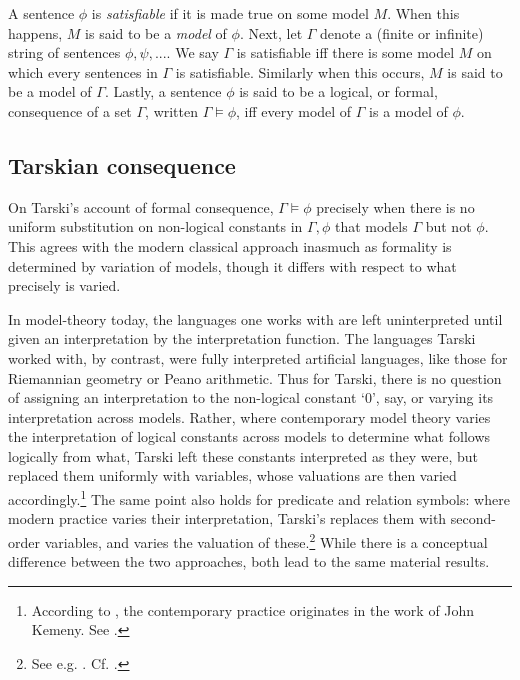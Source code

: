 \documentclass[]{article}
\begin{document}
A sentence $\phi$ is \textit{satisfiable} if it is made true on some model $M$. When this happens, $M$ is said to be a \textit{model} of $\phi$. Next, let $\Gamma$ denote a (finite or infinite) string of sentences $\phi, \psi, ...$. We say $\Gamma$ is satisfiable iff there is some model $M$ on which every sentences in $\Gamma$ is satisfiable. Similarly when this occurs, $M$ is said to be a model of $\Gamma$. Lastly, a sentence $\phi$ is said to be a logical, or formal, consequence of a set $\Gamma$, written $\Gamma \models \phi$, iff every model of $\Gamma$ is a model of $\phi$.
\subsection{Tarskian consequence}
On Tarski's account of formal consequence, $\Gamma \models \phi$ precisely when there is no uniform substitution on  non-logical constants in $\Gamma, \phi$ that models $\Gamma$ but not $\phi$. This agrees with the modern classical approach inasmuch as formality is determined by variation of models, though it differs with respect to what precisely is varied.

In model-theory today, the languages one works with are left uninterpreted until given an interpretation by the interpretation function. The languages Tarski worked with, by contrast, were fully interpreted artificial languages, like those for Riemannian geometry or Peano arithmetic. Thus for Tarski, there is no question of assigning an interpretation to the non-logical constant `0', say, or varying its interpretation across models. Rather, where contemporary model theory varies the interpretation of logical constants across models to determine what follows logically from what, Tarski left these constants interpreted as they were, but replaced them uniformly with variables, whose valuations are then varied accordingly.\footnote{According to \cite[p. 433]{Schiemer2013}, the contemporary practice originates in the work of John Kemeny. See \cite{Kemeny1956} \cite{Kemeny1956b}.} The same point also holds for predicate and relation symbols: where modern practice varies their interpretation, Tarski's replaces them with second-order variables, and varies the valuation of these.\footnote{See e.g. \cite[pp. 122-23]{Tarski1941}. Cf. \cite[p. 69]{Etchemendy1988} \cite[p. 448]{Schiemer2013}.} While there is a conceptual difference between the two approaches, both lead to the same material results.
\end{document}
